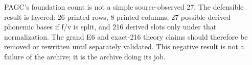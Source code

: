 PAGC's foundation count is not a simple source-observed 27. The defensible result is layered: 26 printed rows, 8 printed columns, 27 possible derived phonemic bases if f/v is split, and 216 derived slots only under that normalization. The grand E6 and exact-216 theory claims should therefore be removed or rewritten until separately validated. This negative result is not a failure of the archive; it is the archive doing its job.
